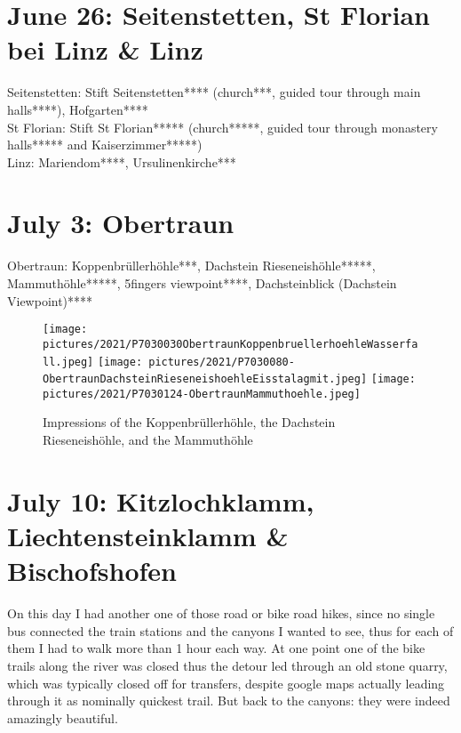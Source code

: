 {\section{June 26: Seitenstetten, St Florian bei Linz \& Linz}
\label{2021SeitenstettenStFlorian}

Seitenstetten: Stift Seitenstetten**** (church***, guided tour through main halls****), Hofgarten****\\
St Florian: Stift St Florian***** (church*****, guided tour through monastery halls***** and Kaiserzimmer*****)\\
Linz: Mariendom****, Ursulinenkirche***\\

\section{July 3: Obertraun}
\label{2021Obertraun}

Obertraun: Koppenbr\"ullerh\"ohle***, Dachstein Rieseneish\"ohle*****, Mammuth\"ohle*****, 5fingers viewpoint****, Dachsteinblick (Dachstein Viewpoint)****

    \begin{figure}[htbp!]
  \texttt{[image: pictures/2021/P7030030ObertraunKoppenbruellerhoehleWasserfall.jpeg]}
    \texttt{[image: pictures/2021/P7030080-ObertraunDachsteinRieseneishoehleEisstalagmit.jpeg]}
      \texttt{[image: pictures/2021/P7030124-ObertraunMammuthoehle.jpeg]}
  \caption{Impressions of the Koppenbr\"ullerh\"ohle, the Dachstein Rieseneish\"ohle, and the Mammuth\"ohle}
  \label{fig:Obertraun}
\end{figure}

\section{July 10: Kitzlochklamm, Liechtensteinklamm \& Bischofshofen}
\label{2021Pongau}

On this day I had another one of those road or bike road hikes, since no single bus connected the train stations and the canyons I wanted to see, thus for each of them I had to walk more than 1 hour each way. At one point one of the bike trails along the river was closed thus the detour led through an old stone quarry, which was typically closed off for transfers, despite google maps actually leading through it as nominally quickest trail. But back to the canyons: they were indeed amazingly beautiful.\\

}

